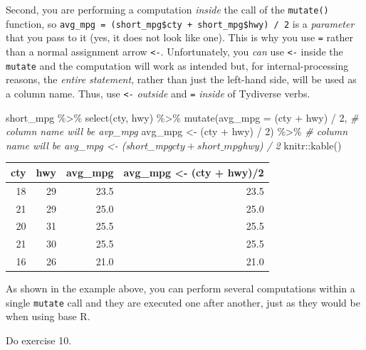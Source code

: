 \documentclass[
]{book}
\newenvironment{Shaded}{\begin{snugshade}}{\end{snugshade}}
\newcommand{\AttributeTok}[1]{\textcolor[rgb]{0.77,0.63,0.00}{#1}}
\newcommand{\CommentTok}[1]{\textcolor[rgb]{0.56,0.35,0.01}{\textit{#1}}}
\newcommand{\DecValTok}[1]{\textcolor[rgb]{0.00,0.00,0.81}{#1}}
\newcommand{\FunctionTok}[1]{\textcolor[rgb]{0.00,0.00,0.00}{#1}}
\newcommand{\NormalTok}[1]{#1}
\newcommand{\OtherTok}[1]{\textcolor[rgb]{0.56,0.35,0.01}{#1}}
\newcommand{\SpecialCharTok}[1]{\textcolor[rgb]{0.00,0.00,0.00}{#1}}
\begin{document}
Second, you are performing a computation \emph{inside} the call of the \texttt{mutate()} function, so \texttt{avg\_mpg\ =\ (short\_mpg\$cty\ +\ short\_mpg\$hwy)\ /\ 2} is a \emph{parameter} that you pass to it (yes, it does not look like one). This is why you use \texttt{=} rather than a normal assignment arrow \texttt{\textless{}-}. Unfortunately, you \emph{can} use \texttt{\textless{}-} inside the \texttt{mutate} and the computation will work as intended but, for internal-processing reasons, the \emph{entire statement}, rather than just the left-hand side, will be used as a column name. Thus, use \texttt{\textless{}-} \emph{outside} and \texttt{=} \emph{inside} of Tydiverse verbs.

\begin{Shaded}
\begin{Highlighting}[]
\NormalTok{short\_mpg }\SpecialCharTok{\%\textgreater{}\%}
  \FunctionTok{select}\NormalTok{(cty, hwy) }\SpecialCharTok{\%\textgreater{}\%}
  \FunctionTok{mutate}\NormalTok{(}\AttributeTok{avg\_mpg =}\NormalTok{  (cty }\SpecialCharTok{+}\NormalTok{ hwy) }\SpecialCharTok{/} \DecValTok{2}\NormalTok{,      }\CommentTok{\# column name will be avp\_mpg}
\NormalTok{         avg\_mpg }\OtherTok{\textless{}{-}}\NormalTok{ (cty }\SpecialCharTok{+}\NormalTok{ hwy) }\SpecialCharTok{/} \DecValTok{2}\NormalTok{) }\SpecialCharTok{\%\textgreater{}\%} \CommentTok{\# column name will be \textasciigrave{}avg\_mpg \textless{}{-} (short\_mpg$cty + short\_mpg$hwy) / 2\textasciigrave{}}
\NormalTok{  knitr}\SpecialCharTok{::}\FunctionTok{kable}\NormalTok{()}
\end{Highlighting}
\end{Shaded}

\begin{tabular}{r|r|r|r}
\hline
cty & hwy & avg\_mpg & avg\_mpg <- (cty + hwy)/2\\
\hline
18 & 29 & 23.5 & 23.5\\
\hline
21 & 29 & 25.0 & 25.0\\
\hline
20 & 31 & 25.5 & 25.5\\
\hline
21 & 30 & 25.5 & 25.5\\
\hline
16 & 26 & 21.0 & 21.0\\
\hline
\end{tabular}

As shown in the example above, you can perform several computations within a single \texttt{mutate} call and they are executed one after another, just as they would be when using base R.

Do exercise 10.
\end{document}
